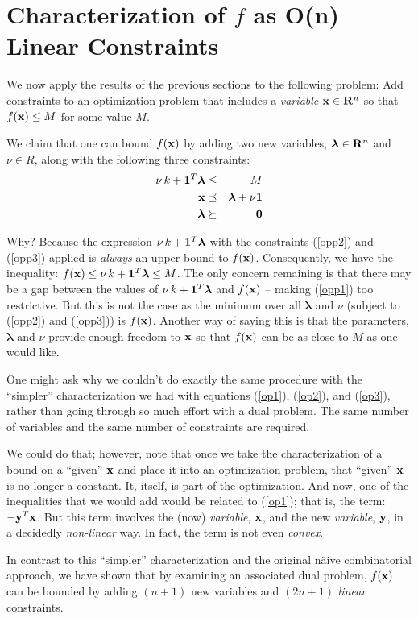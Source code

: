 \documentclass[12pt]{article}
\begin{document}
\section{Characterization of $f$ as O(n) Linear Constraints}
We now apply the results of the previous sections to the following problem:
Add constraints to an optimization problem that includes a {\it variable} ${\bf x} \in {\bf R}^n$
so that $f({\bf x}) \le M$ for some value $M$.

We claim that one can bound $f({\bf x})$ by adding two new variables,
${\boldsymbol \lambda} \in {\bf R}^n$ 
and $\nu \in R$, along with the following three constraints:
\begin{eqnarray}
	\nu \, k + {\bf 1}^T {\boldsymbol \lambda}  & \le & M \label{opp1} \\ 
	{\bf x} & \preceq & {\boldsymbol \lambda} + \nu {\bf 1} \label{opp2} \\
	{\boldsymbol \lambda} & \succeq & {\bf 0}  \label{opp3}
\end{eqnarray}

Why? Because the expression $\nu \, k + {\bf 1}^T {\boldsymbol \lambda}$ with
the constraints (\ref{opp2}) and (\ref{opp3}) applied is {\it always\/} 
an upper bound to $f({\bf x})$. 
Consequently, we have the inequality: 
$f({\bf x}) \le \nu \, k + {\bf 1}^T {\boldsymbol \lambda} \le M$.
The only concern remaining is that there may be a gap between the values of 
$\nu \, k + {\bf 1}^T {\boldsymbol \lambda}$ 
and $f({\bf x})$ -- making (\ref{opp1}) too restrictive. 
But this is not the case as the minimum over all ${\boldsymbol \lambda}$ 
and $\nu$ (subject to (\ref{opp2}) and (\ref{opp3})) is $f({\bf x})$.
Another way of saying this is that the parameters, ${\boldsymbol \lambda}$ 
and $\nu$ provide enough freedom to ${\bf x}$ so that $f({\bf x})$ can be 
as close to $M$ as one would like.


One might ask why we couldn't do exactly the same procedure with the ``simpler''
characterization we had with equations
(\ref{op1}), (\ref{op2}), and (\ref{op3}), rather than going through so much 
effort with a dual problem. The same number of variables and the same number 
of constraints are required.

We could do that; however, note that once we take the characterization of a 
bound on a ``given'' ${\bf x}$ and place it into an optimization problem, that 
``given'' ${\bf x}$ is no longer a constant. It, itself, is part of the 
optimization. And now, one of the inequalities that we would add
would be related to (\ref{op1}); that is, the term: $-{\bf y}^T {\bf x}$. But 
this term involves the (now) {\it variable\/}, ${\bf x}$, and the new 
{\it variable\/}, ${\bf y}$, in a decidedly {\it non-linear\/} way.
In fact, the term is not even {\it convex\/}.

In contrast to this ``simpler'' characterization and the original n{\"a}ive 
combinatorial approach, we have shown that 
by examining an associated dual problem, $f({\bf x})$ can be bounded by
adding $(n+1)$ new variables and $(2n + 1)$ {\it linear\/} constraints.
\end{document}
